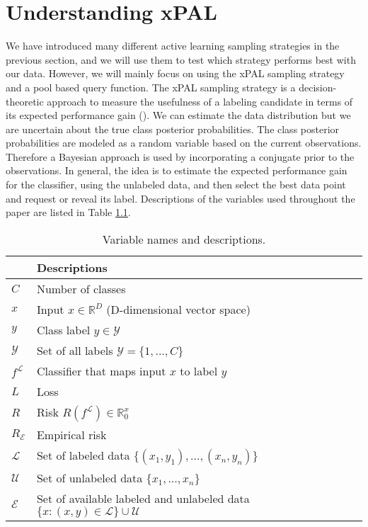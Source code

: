 \chapter{Understanding xPAL}

We have introduced many different active learning sampling strategies in the previous section, and we will use them to test which strategy performs best with our data. However, we will mainly focus on using the xPAL sampling strategy and a pool based query function. The xPAL sampling strategy is a decision-theoretic approach to measure the usefulness of a labeling candidate in terms of its expected performance gain (\cite{kottke2021toward}). We can estimate the data distribution but we are uncertain about the true class posterior probabilities. The class posterior probabilities are modeled as a random variable based on the current observations. Therefore a Bayesian approach is used by incorporating a conjugate prior to the observations. In general, the idea is to estimate the expected performance gain for the classifier, using the unlabeled data, and then select the best data point and request or reveal its label. Descriptions of the variables used throughout the paper are listed in Table \ref{tab:var_defs}.

\begin{table}[ht]
\centering
\renewcommand{\arraystretch}{1.2}
\begin{tabular}{|l|l|}
\hline
{} & \textbf{Descriptions} \\
\hline
$C$                         & Number of classes \\
\hline
$x$                         & Input $x \in \mathbb{R}^D$ (D-dimensional vector space)\\
\hline
$y$                         & Class label $y \in \mathcal{Y}$ \\
\hline
$\mathcal{Y}$               & Set of all labels $\mathcal{Y} = \{ 1,...,C \}$ \\
\hline
$f^{\mathcal{L}}$           & Classifier that maps input $x$ to label $y$ \\
\hline
$\textit{L}$                & Loss\\
\hline
$\textit{R}$                & Risk $\textit{R}(f^{\mathcal{L}}) \in \mathbb{R}_0^x$ \\
\hline
$\textit{R}_{\mathcal{E}}$  & Empirical risk\\
\hline
$\mathcal{L}$               & Set of labeled data $\{(x_1,y_1),...,(x_n,y_n)\}$ \\
\hline
$\mathcal{U}$               & Set of unlabeled data $\{x_1,...,x_n\}$ \\
\hline
$\mathcal{E}$               & Set of available labeled and unlabeled data $\{x : (x,y) \in \mathcal{L}\} \cup \mathcal{U}$ \\
\hline
\end{tabular}
\caption{Variable names and descriptions.}
\label{tab:var_defs}
\end{table}


